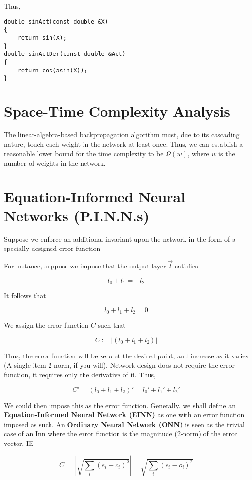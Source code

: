 \documentclass[8pt]{amsart}
\begin{document}
Thus,

\begin{verbatim}
double sinAct(const double &X)
{
    return sin(X);
}
double sinActDer(const double &Act)
{
    return cos(asin(X));
}
\end{verbatim}

\section{Space-Time Complexity Analysis}

The linear-algebra-based backpropagation algorithm must, due to its
cascading nature, touch each weight in the network at least once. Thus,
we can establish a reasonable lower bound for the time complexity to be
$\Omega (w)$, where $w$ is the number of weights in the network.

\section{Equation-Informed Neural Networks (P.I.N.N.s)}

Suppose we enforce an additional invariant upon the network in the
form of a specially-designed error function.

For instance, suppose we impose that the output layer $\vec{l}$
satisfies

\[
    l_0 + l_1 = -l_2
\]

It follows that

\[
    l_0 + l_1 + l_2 = 0
\]

We assign the error function $C$ such that

\[
    C := |(l_0 + l_1 + l_2)|
\]

Thus, the error function will be zero at the desired point,
and increase as it varies (A single-item 2-norm, if you will).
Network design does not require the error function, it requires
only the derivative of it. Thus,

\[
    C' = (l_0 + l_1 + l_2)' = l_0' + l_1' + l_2'
\]

We could then impose this as the error function. Generally,
we shall define an \textbf{Equation-Informed Neural Network (EINN)}
as one with an error function imposed as such. An \textbf{Ordinary Neural 
Network (ONN)} is seen as the trivial case of an Inn where the error
function is the magnitude (2-norm) of the error vector, IE 

\[
    C := | \sqrt{\sum_i{(e_i - o_i)^2}} | = \sqrt{\sum_i{(e_i - o_i)^2}}
\]
\end{document}
